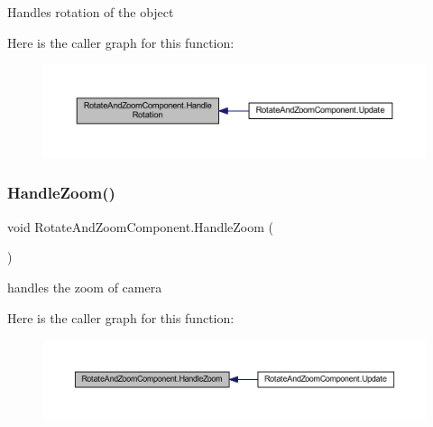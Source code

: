 Handles rotation of the object 

Here is the caller graph for this function\+:
\nopagebreak
\begin{figure}[H]
\begin{center}
\leavevmode
\includegraphics[width=350pt]{class_rotate_and_zoom_component_a4f44c8f8dc5f9b2f1f38075595d20489_icgraph}
\end{center}
\end{figure}
\mbox{\label{class_rotate_and_zoom_component_a8157abad4e54f49ebccf9499a3f698a8}} 
\subsubsection{\texorpdfstring{Handle\+Zoom()}{HandleZoom()}}
{\footnotesize\ttfamily void Rotate\+And\+Zoom\+Component.\+Handle\+Zoom (\begin{DoxyParamCaption}{ }\end{DoxyParamCaption})\hspace{0.3cm}{\ttfamily [private]}}



handles the zoom of camera 

Here is the caller graph for this function\+:
\nopagebreak
\begin{figure}[H]
\begin{center}
\leavevmode
\includegraphics[width=350pt]{class_rotate_and_zoom_component_a8157abad4e54f49ebccf9499a3f698a8_icgraph}
\end{center}
\end{figure}
\mbox{\label{class_rotate_and_zoom_component_a1afdb59de9b4b255456351189e2f6932}} 
